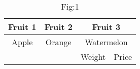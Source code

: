 \documentclass[10 pt]{article}
\begin{document}
\begin{table}
\centering
\begin{tabular}{|c|c|c|c|}
\hline
Fruit 1&Fruit 2&\multicolumn{2}{c|}{Fruit 3}\\
\hline
Apple&Orange&\multicolumn{2}{c|}{Watermelon}\\
\cline{3-4}
&&Weight & Price\\
\hline
\end{tabular}
\caption{Fig:1}
\end{table}
\end{document}
